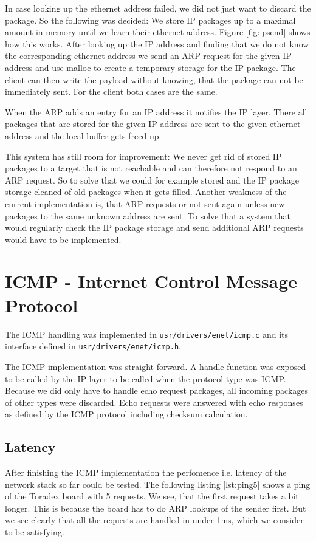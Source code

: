 In case looking up the ethernet address failed, we did not just want to discard the package. So the following was decided: We store IP packages up to a maximal amount in memory until we learn their ethernet address. Figure \ref{fig:ipsend} shows how this works. After looking up the IP address and finding that we do not know the corresponding ethernet address we send an ARP request for the given IP address and use malloc to create a temporary storage for the IP package. The client can then write the payload without knowing, that the package can not be immediately sent. For the client both cases are the same.

When the ARP adds an entry for an IP address it notifies the IP layer. There all packages that are stored for the given IP address are sent to the given ethernet address and the local buffer gets freed up.

This system has still room for improvement: We never get rid of stored IP packages to a target that is not reachable and can therefore not respond to an ARP request. So to solve that we could for example stored and the IP package storage cleaned of old packages when it gets filled. Another weakness of the current implementation is, that ARP requests or not sent again unless new packages to the same unknown address are sent. To solve that a system that would regularly check the IP package storage and send additional ARP requests would have to be implemented.

\section{ICMP - Internet Control Message Protocol}
The ICMP handling was implemented in \verb|usr/drivers/enet/icmp.c| and its interface defined in \verb|usr/drivers/enet/icmp.h|.

The ICMP implementation was straight forward. A handle function was exposed to be called by the IP layer to be called when the protocol type was ICMP. Because we did only have to handle echo request packages, all incoming packages of other types were discarded. Echo requests were answered with echo responses as defined by the ICMP protocol including checksum calculation.

\subsection{Latency}
After finishing the ICMP implementation the perfomence i.e. latency of the network stack so far could be tested. The following listing \ref{lst:ping5} shows a ping of the Toradex board with 5 requests. We see, that the first request takes a bit longer. This is because the board has to do ARP lookups of the sender first. But we see clearly that all the requests are handled in under 1ms, which we consider to be satisfying.

